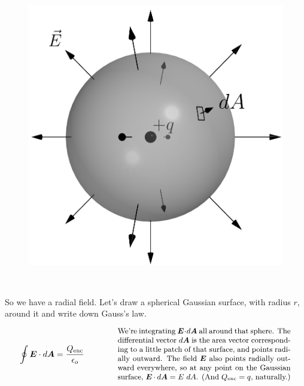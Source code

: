 \documentclass{article}
\begin{document}
\begin{minipage}{0.3\textwidth}
\begin{figure}[H]
\centering
\includegraphics[width=\textwidth]{figures/2l4.png}
\end{figure}
\end{minipage}
~
\begin{minipage}{0.6\textwidth}
    So we have a radial field. Let's draw a spherical Gaussian surface, with radius $r$, around it and write down Gauss's law.
\end{minipage}

\vspace{1em}

\begin{equation*}
    \oint \bm{E} \cdot d\bm{A} = \frac{Q_{\text{enc}}}{\epsilon_o} \qquad\qquad \parbox[c]{0.6\textwidth}{\small We're integrating $\bm{E} \cdot d\bm{A}$ all around that sphere. The differential vector $d\bm{A}$ is the area vector corresponding to a little patch of that surface, and points radially outward. The field $\bm{E}$ also points radially outward everywhere, so at any point on the Gaussian surface, $\bm{E} \cdot d\bm{A} = E\ dA$. (And $Q_{\text{enc}} = q$, naturally.)}
\end{equation*}

\vspace{1em}
\end{document}
